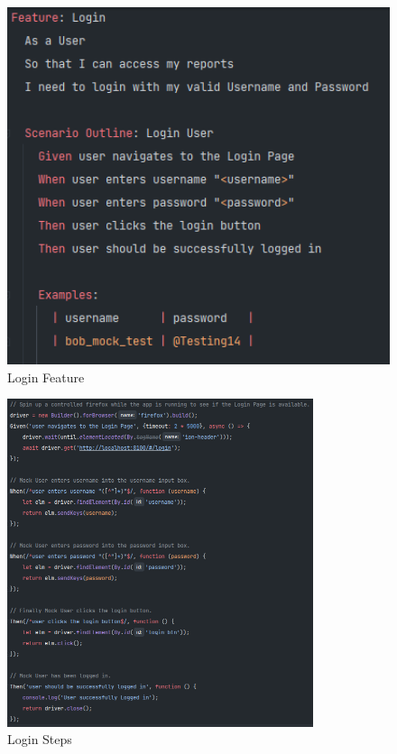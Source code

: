 \begin{figure}[H]
    \centering
    \caption{Login Feature}
    \label{image:loginFeature}
    \includegraphics[width=1.0\textwidth]{images/repota/tests/login_feature.png}
\end{figure}

\begin{figure}[H]
    \centering
    \caption{Login Steps}
    \label{image:loginSteps}
    \includegraphics[width=0.8\textwidth]{images/repota/tests/login_steps.png}
\end{figure}

